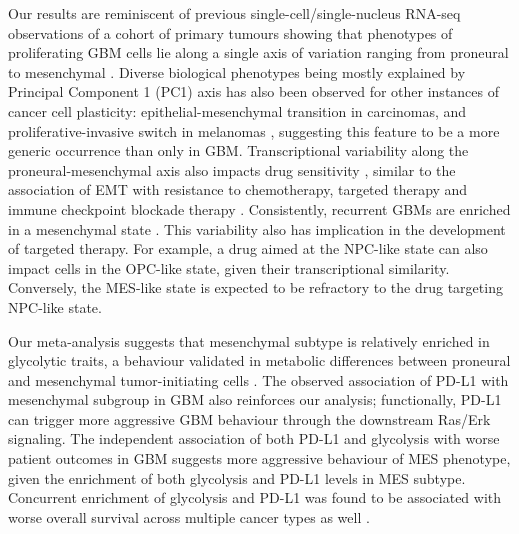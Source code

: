 \documentclass[11pt,a4paper]{article}
\begin{document}
Our results are reminiscent of previous single-cell/single-nucleus RNA-seq observations of a cohort of primary tumours showing that phenotypes of proliferating GBM cells lie along a single axis of variation ranging from proneural to mesenchymal \parencite{prolif1axis}. Diverse biological phenotypes being mostly explained by Principal Component 1 (PC1) axis has also been observed for other instances of cancer cell plasticity: epithelial-mesenchymal transition in carcinomas, and proliferative-invasive switch in melanomas \parencite{pc1teams}, suggesting this feature to be a more generic occurrence than only in GBM. Transcriptional variability along the proneural-mesenchymal axis also impacts drug sensitivity \parencite{gbmclonal}, similar to the association of EMT with resistance to chemotherapy, targeted therapy and immune checkpoint blockade therapy \parencite{emtresist, breaster, emtimmuno}. Consistently, recurrent GBMs are enriched in a mesenchymal state \parencite{gbmscatlas}. This variability also has implication in the development of targeted therapy. For example, a drug aimed at the NPC-like state can also impact cells in the OPC-like state, given their transcriptional similarity. Conversely, the MES-like state is expected to be refractory to the drug targeting NPC-like state.

Our meta-analysis suggests that mesenchymal subtype is relatively enriched in glycolytic traits, a behaviour validated in metabolic differences between proneural and mesenchymal tumor-initiating cells \parencite{gbmmetabol, glycmes}. The observed association of PD-L1 with mesenchymal subgroup in GBM \parencite{gbmpdl1vesc, gbmpdl1prog, immsubtype} also reinforces our analysis; functionally, PD-L1 can trigger more aggressive GBM behaviour through the downstream Ras/Erk signaling. The independent association of both PD-L1 and glycolysis with worse patient outcomes in GBM \parencite{gbmpdl1expr, gbmpdl1prog} suggests more aggressive behaviour of MES phenotype, given the enrichment of both glycolysis and PD-L1 levels in MES subtype. Concurrent enrichment of glycolysis and PD-L1 was found to be associated with worse overall survival across multiple cancer types as well \parencite{pdl1pemt}.
\end{document}
